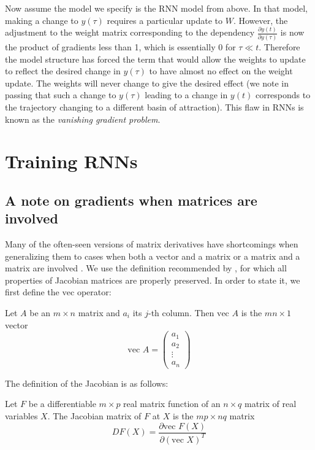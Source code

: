 Now assume the model we specify is the RNN model from above. In that model, making a change to $y(\tau)$ requires a particular update to $W$. However, the adjustment to the weight matrix corresponding to the dependency $\frac{\partial y(t)}{\partial y(\tau)}$ is now the product of gradients less than 1, which is essentially 0 for $\tau \ll t$. Therefore the model structure has forced the term that would allow the weights to update to reflect the desired change in $y(\tau)$ to have almost no effect on the weight update. The weights will never change to give the desired effect (we note in passing that such a change to $y(\tau)$ leading to a change in $y(t)$ corresponds to the trajectory changing to a different basin of attraction). This flaw in RNNs is known as the \emph{vanishing gradient problem}.

\section{Training RNNs}

\subsection{A note on gradients when matrices are involved}

Many of the often-seen versions of matrix derivatives have shortcomings when generalizing them to cases when both a vector and a matrix or a matrix and a matrix are involved \cite[p. 193-197]{magnus1999matrix}. We use the definition recommended by \citet{magnus1999matrix}, for which all properties of Jacobian matrices are properly preserved. In order to state it, we first define the $\mbox{vec}$ operator:

\begin{definition}
  Let $A$ be an $m \times n$ matrix and $a_i$ its $j$-th column. Then $\mbox{vec } A$ is the $mn \times 1$ vector
  \begin{equation*}
    \mbox{vec } A = \begin{pmatrix}
      a_1 \\ a_2 \\ \vdots \\ a_n
      \end{pmatrix}
  \end{equation*}
  \cite[p. 34]{magnus1999matrix}
\end{definition}

The definition of the Jacobian is as follows:

\begin{definition}
  Let $F$ be a differentiable $m \times p$ real matrix function of an $n \times q$ matrix of real variables $X$. The Jacobian matrix of $F$ at $X$ is the $mp \times nq$ matrix
\begin{equation*}
  D F(X) = \frac{\partial \mbox{vec } F(X)}{\partial (\mbox{vec } X)^T}
\end{equation*}
\end{definition}

